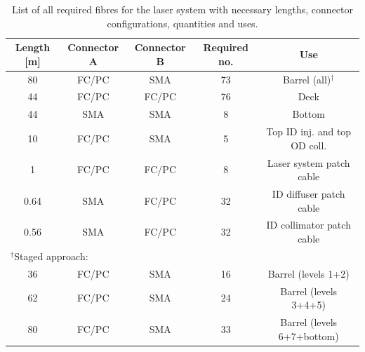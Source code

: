 \documentclass[a4paper,11pt]{article}
\begin{document}
\begin{table}[h]
\centering
\setlength{\tabcolsep}{4pt}
\begin{tabular}{ccccc}
\toprule
Length [m]	&	Connector A	&	Connector B	&	Required no.	&	Use		\\ \midrule
80			&	FC/PC		&	SMA			&	73				&	Barrel (all)$^\dagger$	\\
44			&	FC/PC		&	FC/PC		&	76				&	Deck	\\
44			&	SMA			&	SMA			&	8				&	Bottom	\\
10			&	FC/PC		&	SMA			&	5				&	Top ID inj. and top OD coll. \\
1			&	FC/PC		&	FC/PC		&	8				&	Laser system patch cable \\
0.64		&	SMA			&	FC/PC		&	32				&	ID diffuser patch cable	\\
0.56		&	SMA			&	FC/PC		&	32				&	ID collimator patch cable	\\ \midrule
\multicolumn{3}{l}{$^\dagger$Staged approach:}			&					&			\\
36			&	FC/PC		&	SMA			&	16				&	Barrel (levels 1+2) \\
62			&	FC/PC		&	SMA			&	24				&	Barrel (levels 3+4+5)	\\
80			&	FC/PC		&	SMA			&	33				&	Barrel (levels 6+7+bottom)	\\
\bottomrule
\end{tabular}
\caption{List of all required fibres for the laser system with necessary lengths, connector configurations, quantities and uses.}\label{tab:fibreSummaryLaser}
\end{table}
\end{document}
